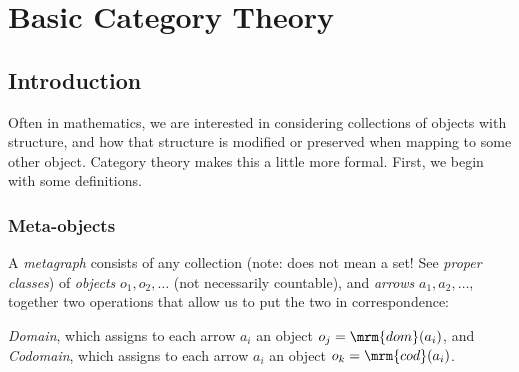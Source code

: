 \documentclass{fkbook}
\begin{document}
\tableofcontents


\mainmatter
\pagestyle{main}

\chapter{Basic Category Theory}
\section{Introduction}
Often in mathematics, we are interested in considering collections of
objects with structure, and how that structure is modified or
preserved when mapping to some other object. Category theory makes
this a little more formal. First, we begin with some definitions.\\

\subsection{Meta-objects}
\begin{definition}[Metagraph]
  A \emph{metagraph} consists of any collection (note: does not mean a
  set! See \emph{proper classes}) of \emph{objects} $o_1, o_2,
  \ldots$ (not necessarily countable), and \emph{arrows} $a_1, a_2,
  \ldots$, together two operations that allow us to put the two in
  correspondence:\\
\end{definition}
\begin{definition}
  \emph{Domain}, which assigns to each arrow $a_i$ an object $o_j =
  \mrm{dom}(a_i)$, and \emph{Codomain}, which assigns to each arrow
  $a_i$ an object $o_k = \mrm{cod}(a_i)$.
\end{definition}
\end{document}
